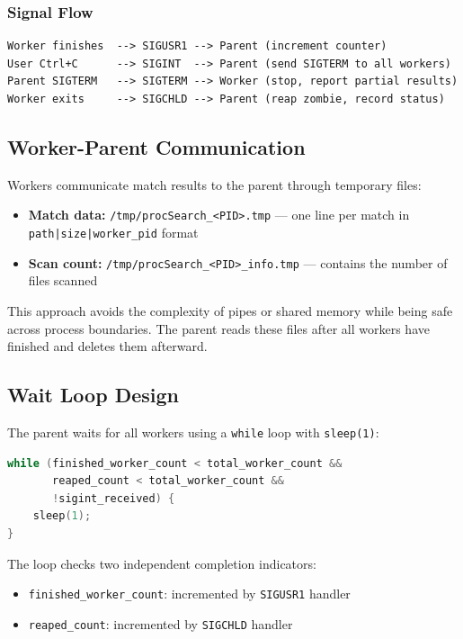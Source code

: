 \documentclass[12pt,a4paper]{article}
\begin{document}
\subsubsection{Signal Flow}

\begin{lstlisting}
Worker finishes  --> SIGUSR1 --> Parent (increment counter)
User Ctrl+C      --> SIGINT  --> Parent (send SIGTERM to all workers)
Parent SIGTERM   --> SIGTERM --> Worker (stop, report partial results)
Worker exits     --> SIGCHLD --> Parent (reap zombie, record status)
\end{lstlisting}

\subsection{Worker-Parent Communication}

Workers communicate match results to the parent through temporary files:

\begin{itemize}[noitemsep]
    \item \textbf{Match data:} \texttt{/tmp/procSearch\_<PID>.tmp} --- one line per match in \texttt{path|size|worker\_pid} format
    \item \textbf{Scan count:} \texttt{/tmp/procSearch\_<PID>\_info.tmp} --- contains the number of files scanned
\end{itemize}

This approach avoids the complexity of pipes or shared memory while being safe across process boundaries. The parent reads these files after all workers have finished and deletes them afterward.

\subsection{Wait Loop Design}

The parent waits for all workers using a \texttt{while} loop with \texttt{sleep(1)}:

\begin{lstlisting}[language=C]
while (finished_worker_count < total_worker_count &&
       reaped_count < total_worker_count &&
       !sigint_received) {
    sleep(1);
}
\end{lstlisting}

The loop checks two independent completion indicators:

\begin{itemize}[noitemsep]
    \item \texttt{finished\_worker\_count}: incremented by \texttt{SIGUSR1} handler
    \item \texttt{reaped\_count}: incremented by \texttt{SIGCHLD} handler
\end{itemize}
\end{document}

